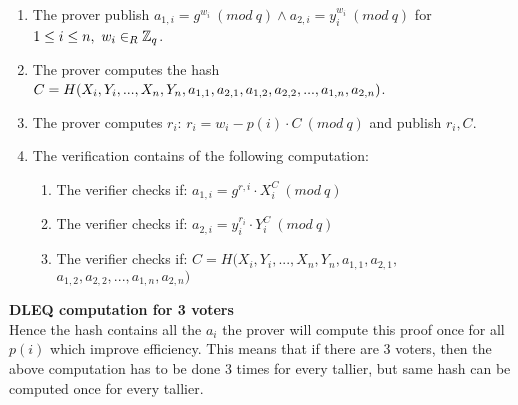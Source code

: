 \begin{enumerate}
    \item The prover publish  \begin{math}a_{1,i}=g^{w_i} \ (mod\ q)  \land a_{2,i}=y_i^{w_i} \ (mod\ q)\end{math}  for  \begin{math} 1\leq i \leq n, \ w_i\in_R \mathbb{Z}_q \end{math}.
    \item The prover computes the hash \begin{math}C=H(X_i,Y_i,...,X_n,Y_n,a_{1,1},a_{2,1},\\a_{1,2},a_{2,2},...,a_{1,n},a_{2,n})\end{math}.
    \item The prover computes \begin{math}r_i\end{math}:  \begin{math}r_i=w_i-p(i)  \cdot  C \ (mod\ q)\end{math} and publish \begin{math}r_i,C\end{math}.
    \item The verification contains of the following computation:
    \begin{enumerate}        
        \item The verifier checks if:   \begin{math}a_{1,i} = g^{r,i} \cdot X_i^C \ (mod\ q) \end{math}
        \item The verifier checks if:  \begin{math} a_{2,i}=y_i^{r_{i}}  \cdot  Y_i^C \ (mod\ q)\end{math}
         \item The verifier checks if:  $C=H(X_i,Y_i,...,X_n,Y_n,a_{1,1},a_{2,1},$\\
$a_{1,2},a_{2,2},...,a_{1,n},a_{2,n})$
    \end{enumerate}
\end{enumerate}

\noindent 
\textbf{DLEQ computation for 3 voters}\\
Hence the hash contains all the  \begin{math}a_i \end{math} the prover will compute this proof once for all  \begin{math}p(i) \end{math} which improve efficiency. This means that if there are 3 voters, then the above computation has to be done 3 times for every tallier, but same hash can be computed once for every tallier. 



